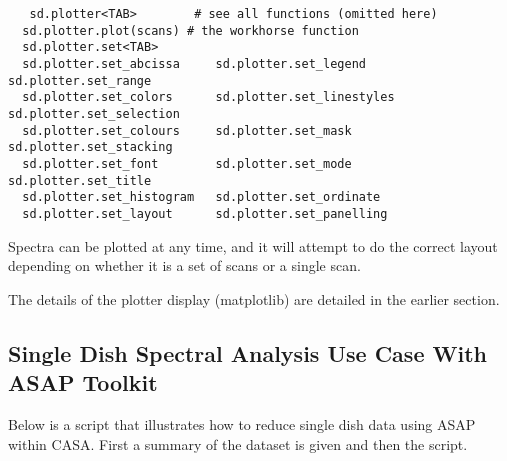 \small
\begin{verbatim}
   sd.plotter<TAB>        # see all functions (omitted here)
  sd.plotter.plot(scans) # the workhorse function
  sd.plotter.set<TAB>
  sd.plotter.set_abcissa     sd.plotter.set_legend      sd.plotter.set_range
  sd.plotter.set_colors      sd.plotter.set_linestyles  sd.plotter.set_selection
  sd.plotter.set_colours     sd.plotter.set_mask        sd.plotter.set_stacking
  sd.plotter.set_font        sd.plotter.set_mode        sd.plotter.set_title
  sd.plotter.set_histogram   sd.plotter.set_ordinate    
  sd.plotter.set_layout      sd.plotter.set_panelling   
\end{verbatim}
\normalsize


Spectra can be plotted at any time, and it will attempt to do the
correct layout depending on whether it is a set of scans or a single
scan. 

The details of the plotter display (matplotlib) are detailed in the
earlier section. 

\subsection{Single Dish Spectral Analysis Use Case With ASAP Toolkit}
\label{subsection:sd.asap.usecase}

Below is a script that illustrates how to reduce single dish data
using ASAP within CASA.  First a summary of the dataset is given and
then the script.

